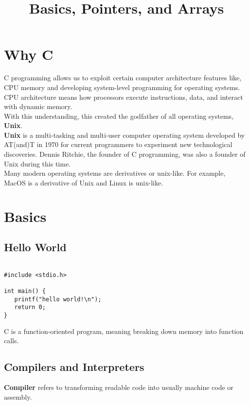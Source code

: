 \documentclass{article}
\title{Basics, Pointers, and Arrays}
\author{}
\date{}
\begin{document}
\maketitle

\section{Why C}
C programming allows us to exploit certain computer architecture features like, CPU memory and developing system-level programming for operating
systems. \\

\noindent CPU architecture means how processors execute instructions, data, and interact with dynamic memory. \\

\noindent With this understanding, this created the godfather of all operating systems, \textbf{Unix}. \\

\noindent \textbf{Unix} is a multi-tasking and multi-user computer operating system developed by AT(and)T in 1970 for current programmers to experiment new technological 
discoveries. Dennis Ritchie, the founder of C programming, was also a founder of Unix during this time. \\

\noindent Many modern operating systems are derivatives or unix-like. For example, MacOS is a derivative of Unix and Linux is unix-like.

\section{Basics}
\subsection*{Hello World}

\begin{verbatim}

#include <stdio.h>

int main() {
   printf("hello world!\n");
   return 0;
}

\end{verbatim}

\noindent C is a function-oriented program, meaning breaking down memory into function calls. \\

\subsection*{Compilers and Interpreters}
\textbf{Compiler} refers to transforming readable code into usually machine code or assembly. \\
\end{document}
